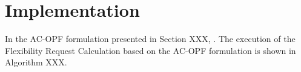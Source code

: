 \section{Implementation}

In the AC-OPF formulation presented in Section XXX, . The execution of the Flexibility Request Calculation based on the AC-OPF formulation is shown in Algorithm XXX. 






